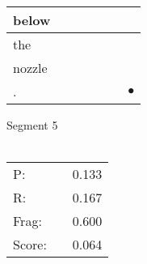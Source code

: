\documentclass[landscape]{article}
\newcommand{\ssp}{\hspace{2pt}}
\newcommand{\mex}{\cellcolor{g}$\bullet$}
\begin{document}
\begin{tabular}{|l|p{10pt}|p{10pt}|p{10pt}|p{10pt}|p{10pt}|p{10pt}|}
\hline
\ssp below \ssp&\hspace{2pt}&\hspace{2pt}&\hspace{2pt}&\hspace{2pt}&\hspace{2pt}&\hspace{2pt}\\
\hline
\ssp the \ssp&\hspace{2pt}&\hspace{2pt}&\hspace{2pt}&\hspace{2pt}&\hspace{2pt}&\hspace{2pt}\\
\hline
\ssp nozzle \ssp&\hspace{2pt}&\hspace{2pt}&\hspace{2pt}&\hspace{2pt}&\hspace{2pt}&\hspace{2pt}\\
\hline
\ssp \cellcolor{ref5}. \ssp&\hspace{2pt}&\hspace{2pt}&\hspace{2pt}&\hspace{2pt}&\hspace{2pt}&\hspace{2pt}\mex\\
\hline
\end{tabular}

\vspace{6pt}
\noindent Segment 5\\\\
\noindent\begin{tabular}{lm{12pt}r}
\hline
P:&&0.133\\
R:&&0.167\\
Frag:&&0.600\\
Score:&&0.064\\
\end{tabular}

\newpage
\end{document}
